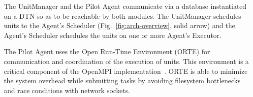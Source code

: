 The UnitManager and the Pilot Agent communicate via a database instantiated
on a DTN so as to be reachable by both modules. The UnitManager schedules
units to the Agent's Scheduler (Fig.~\ref{fig:arch-overview}, solid arrow)
and the Agent's Scheduler schedules the units on one or more Agent's
Executor.

The Pilot Agent uses the Open Run-Time Environment (ORTE) for communication
and coordination of the execution of units. This environment is a critical
component of the OpenMPI implementation~\cite{castain05:_open_rte}. ORTE is
able to minimize the system overhead while submitting tasks by avoiding
filesystem bottlenecks and race conditions with network sockets.
